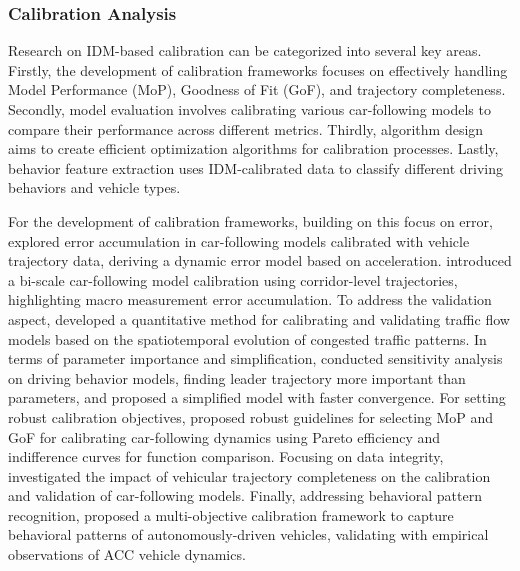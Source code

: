 \documentclass[a4paper,fleqn]{cas-sc}
\begin{document}
\subsubsection{Calibration Analysis }

Research on IDM-based calibration can be categorized into several key areas. Firstly, the development of calibration frameworks focuses on effectively handling Model Performance (MoP), Goodness of Fit (GoF), and trajectory completeness. Secondly, model evaluation involves calibrating various car-following models to compare their performance across different metrics. Thirdly, algorithm design aims to create efficient optimization algorithms for calibration processes. Lastly, behavior feature extraction uses IDM-calibrated data to classify different driving behaviors and vehicle types. 

For the development of calibration frameworks, building on this focus on error, \cite{jin_reducing_2014} explored error accumulation in car-following models calibrated with vehicle trajectory data, deriving a dynamic error model based on acceleration. \cite{longBiScaleCarFollowingModelCalibration2024a} introduced a bi-scale car-following model calibration using corridor-level trajectories, highlighting macro measurement error accumulation. To address the validation aspect, \cite{treiberValidationTrafficFlowModels2012} developed a quantitative method for calibrating and validating traffic flow models based on the spatiotemporal evolution of congested traffic patterns. In terms of parameter importance and simplification, \cite{punzo_we_2015} conducted sensitivity analysis on driving behavior models, finding leader trajectory more important than parameters, and proposed a simplified model with faster convergence. For setting robust calibration objectives, \cite{punzoCalibrationCarFollowingDynamicsAutomated2021} proposed robust guidelines for selecting MoP and GoF for calibrating car-following dynamics using Pareto efficiency and indifference curves for function comparison. Focusing on data integrity, \cite{sharmaMoreAlwaysBetterImpact2019b} investigated the impact of vehicular trajectory completeness on the calibration and validation of car-following models. Finally, addressing behavioral pattern recognition, \cite{zhengMultiObjectiveCalibrationFrameworkCapturing2023b} proposed a multi-objective calibration framework to capture behavioral patterns of autonomously-driven vehicles, validating with empirical observations of ACC vehicle dynamics.
\end{document}
